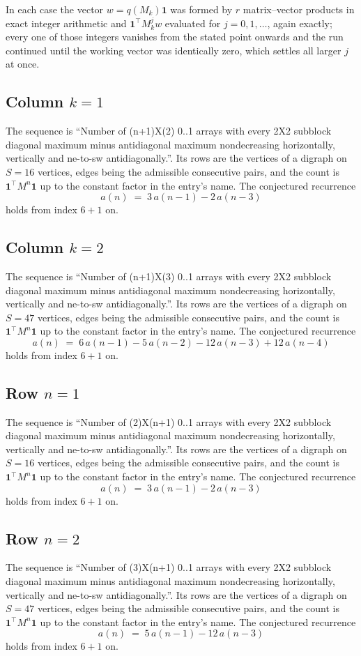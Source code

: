 \documentclass[11pt,a4paper]{article}
\theoremstyle{plain}
\theoremstyle{definition}
\begin{document}
In each case the vector $w=q(M_k)\mathbf{1}$ was formed by $r$ matrix--vector products in
exact integer arithmetic and $\mathbf{1}^{\!\top}M_k^{j}w$ evaluated for $j=0,1,\dots$,
again exactly; every one of those integers vanishes from the stated point onwards and the run
continued until the working vector was identically zero, which settles all larger $j$ at once.

\subsection*{Column $k$$=1$}
The sequence is ``Number of (n+1)X(2) 0..1 arrays with every 2X2 subblock diagonal maximum minus antidiagonal maximum nondecreasing horizontally, vertically and ne-to-sw antidiagonally.''. Its rows are the vertices of a digraph on
$S=16$ vertices, edges being the admissible consecutive pairs, and the count is
$\mathbf{1}^{\!\top}M^{n}\mathbf{1}$ up to the constant factor in the entry's name.
The conjectured recurrence
\[
a(n)\;=\;3\,a(n-1) - 2\,a(n-3)
\]
holds from index $6+1$ on.

\subsection*{Column $k$$=2$}
The sequence is ``Number of (n+1)X(3) 0..1 arrays with every 2X2 subblock diagonal maximum minus antidiagonal maximum nondecreasing horizontally, vertically and ne-to-sw antidiagonally.''. Its rows are the vertices of a digraph on
$S=47$ vertices, edges being the admissible consecutive pairs, and the count is
$\mathbf{1}^{\!\top}M^{n}\mathbf{1}$ up to the constant factor in the entry's name.
The conjectured recurrence
\[
a(n)\;=\;6\,a(n-1) - 5\,a(n-2) - 12\,a(n-3) + 12\,a(n-4)
\]
holds from index $6+1$ on.

\subsection*{Row $n$$=1$}
The sequence is ``Number of (2)X(n+1) 0..1 arrays with every 2X2 subblock diagonal maximum minus antidiagonal maximum nondecreasing horizontally, vertically and ne-to-sw antidiagonally.''. Its rows are the vertices of a digraph on
$S=16$ vertices, edges being the admissible consecutive pairs, and the count is
$\mathbf{1}^{\!\top}M^{n}\mathbf{1}$ up to the constant factor in the entry's name.
The conjectured recurrence
\[
a(n)\;=\;3\,a(n-1) - 2\,a(n-3)
\]
holds from index $6+1$ on.

\subsection*{Row $n$$=2$}
The sequence is ``Number of (3)X(n+1) 0..1 arrays with every 2X2 subblock diagonal maximum minus antidiagonal maximum nondecreasing horizontally, vertically and ne-to-sw antidiagonally.''. Its rows are the vertices of a digraph on
$S=47$ vertices, edges being the admissible consecutive pairs, and the count is
$\mathbf{1}^{\!\top}M^{n}\mathbf{1}$ up to the constant factor in the entry's name.
The conjectured recurrence
\[
a(n)\;=\;5\,a(n-1) - 12\,a(n-3)
\]
holds from index $6+1$ on.
\end{document}

